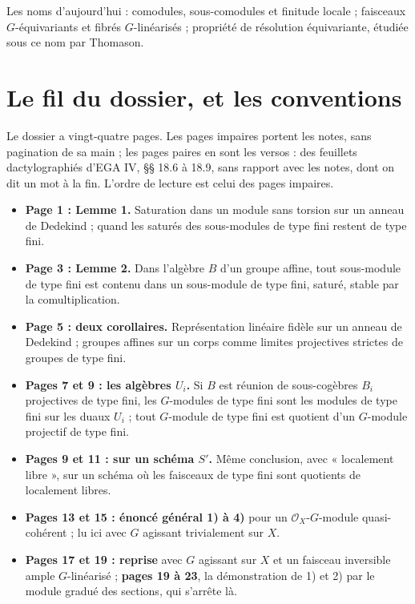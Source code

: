 \documentclass[11pt,a4paper]{article}
\begin{document}
\begin{resume}
Les noms d'aujourd'hui : comodules, sous-comodules et finitude locale ;
faisceaux $G$-équivariants et fibrés $G$-linéarisés ; propriété de
résolution équivariante, étudiée sous ce nom par Thomason.

\end{resume}

\section*{Le fil du dossier, et les conventions}

Le dossier a vingt-quatre pages. Les pages impaires portent les notes, sans
pagination de sa main ; les pages paires en sont les versos : des feuillets
dactylographiés d'EGA IV, §§ 18.6 à 18.9, sans rapport avec les notes, dont
on dit un mot à la fin. L'ordre de lecture est celui des pages impaires.

\begin{itemize}
  \item \textbf{Page 1 : Lemme 1.} Saturation dans un module sans torsion
    sur un anneau de Dedekind ; quand les saturés des sous-modules de type
    fini restent de type fini.
  \item \textbf{Page 3 : Lemme 2.} Dans l'algèbre $B$ d'un groupe affine,
    tout sous-module de type fini est contenu dans un sous-module de type
    fini, saturé, stable par la comultiplication.
  \item \textbf{Page 5 : deux corollaires.} Représentation linéaire fidèle
    sur un anneau de Dedekind ; groupes affines sur un corps comme limites
    projectives strictes de groupes de type fini.
  \item \textbf{Pages 7 et 9 : les algèbres $U_i$.} Si $B$ est réunion de
    sous-cogèbres $B_i$ projectives de type fini, les $G$-modules de type
    fini sont les modules de type fini sur les duaux $U_i$ ; tout $G$-module
    de type fini est quotient d'un $G$-module projectif de type fini.
  \item \textbf{Pages 9 et 11 : sur un schéma $S'$.} Même conclusion, avec
    « localement libre », sur un schéma où les faisceaux de type fini sont
    quotients de localement libres.
  \item \textbf{Pages 13 et 15 : énoncé général 1) à 4)} pour un
    $\mathcal{O}_X$-$G$-module quasi-cohérent ; lu ici avec $G$ agissant
    trivialement sur $X$.
  \item \textbf{Pages 17 et 19 : reprise} avec $G$ agissant sur $X$ et un
    faisceau inversible ample $G$-linéarisé ; \textbf{pages 19 à 23}, la
    démonstration de 1) et 2) par le module gradué des sections, qui
    s'arrête là.
\end{itemize}
\end{document}
